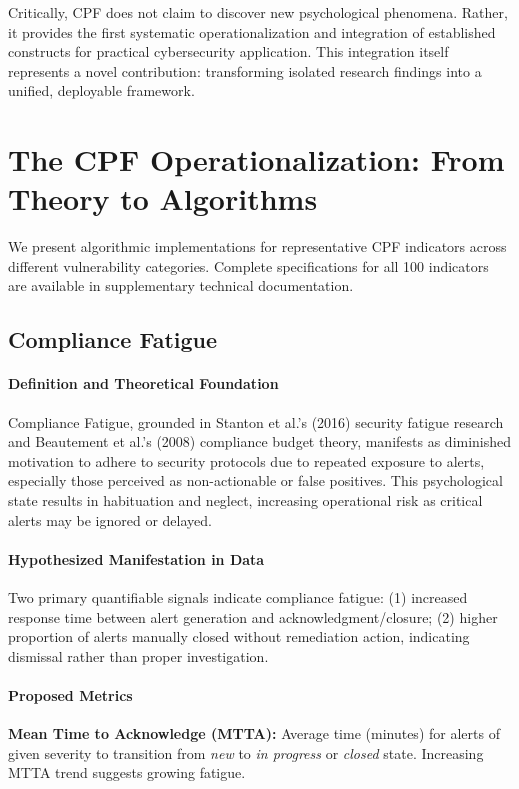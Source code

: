 \documentclass[11pt, a4paper]{article}
\begin{document}
Critically, CPF does not claim to discover new psychological phenomena. Rather, it provides the first systematic operationalization and integration of established constructs for practical cybersecurity application. This integration itself represents a novel contribution: transforming isolated research findings into a unified, deployable framework.

\section{The CPF Operationalization: From Theory to Algorithms}
\label{sec:operationalization}

We present algorithmic implementations for representative CPF indicators across different vulnerability categories. Complete specifications for all 100 indicators are available in supplementary technical documentation.

\subsection{Compliance Fatigue}
\label{subsec:compliance_fatigue}

\paragraph{Definition and Theoretical Foundation}
Compliance Fatigue, grounded in Stanton et al.'s (2016)\cite{stanton2016security} security fatigue research and Beautement et al.'s (2008)\cite{beautement2008compliance} compliance budget theory, manifests as diminished motivation to adhere to security protocols due to repeated exposure to alerts, especially those perceived as non-actionable or false positives. This psychological state results in habituation and neglect, increasing operational risk as critical alerts may be ignored or delayed.

\paragraph{Hypothesized Manifestation in Data}
Two primary quantifiable signals indicate compliance fatigue: (1) increased response time between alert generation and acknowledgment/closure; (2) higher proportion of alerts manually closed without remediation action, indicating dismissal rather than proper investigation.

\paragraph{Proposed Metrics}
\textbf{Mean Time to Acknowledge (MTTA):} Average time (minutes) for alerts of given severity to transition from \textit{new} to \textit{in progress} or \textit{closed} state. Increasing MTTA trend suggests growing fatigue.
\end{document}
